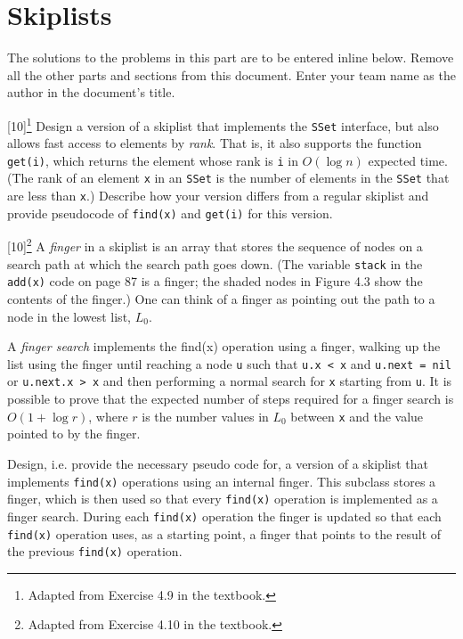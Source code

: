 \documentclass[addpoints]{exam}
\begin{document}
\newpage
\part{Skiplists}

The solutions to the problems in this part are to be entered inline below. Remove all the other parts and sections from this document. Enter your team name as the author in the document's title.

\begin{questions}

  [10]\footnote{Adapted from Exercise 4.9 in the textbook.}
  Design a version of a skiplist that implements the \texttt{SSet} interface, but also allows fast access to elements by \textit{rank}. That is, it also supports the function \texttt{get(i)}, which returns the element whose rank is \texttt{i} in $O(\log n)$ expected time. (The rank of an element \texttt{x} in an \texttt{SSet} is the number of elements in the \texttt{SSet} that are less than \texttt{x}.)
  Describe how your version differs from a regular skiplist and provide pseudocode of \texttt{find(x)} and \texttt{get(i)} for this version.
  \begin{solution}
  \end{solution}

  [10]\footnote{Adapted from Exercise 4.10 in the textbook.}
  A \textit{finger} in a skiplist is an array that stores the sequence of nodes on a search path at which the search path goes down. (The variable \texttt{stack} in the \texttt{add(x)} code on page 87 is a finger; the shaded nodes in Figure 4.3 show the contents of the finger.) One can think of a finger as pointing out the path to a node in the lowest list, $L_0$.

  A \textit{finger search} implements the find(x) operation using a finger, walking up the list using the finger until reaching a node \texttt{u} such that \texttt{u.x < x} and \texttt{u.next = nil} or \texttt{u.next.x > x} and then performing a normal search for \texttt{x} starting from \texttt{u}. It is possible to prove that the expected number of steps required for a finger search is $O(1+\log r)$, where $r$ is the number values in $L_0$ between \texttt{x} and the value pointed to by the finger.

  Design, i.e. provide the necessary pseudo code for, a version of a skiplist that implements \texttt{find(x)} operations using an internal finger. This subclass stores a finger, which is then used so that every \texttt{find(x)} operation is implemented as a finger search. During each \texttt{find(x)} operation the finger is updated so that each \texttt{find(x)} operation uses, as a starting point, a finger that points to the result of the previous \texttt{find(x)} operation.
  \begin{solution}
  \end{solution}


\end{questions}
\end{document}
